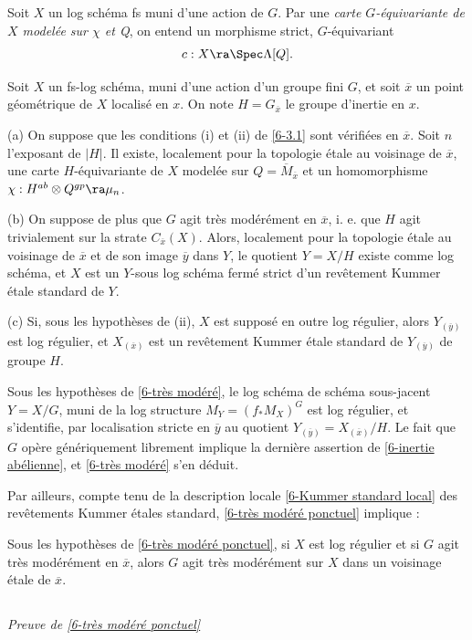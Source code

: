 \documentclass[10pt]{../fichiers-configuration-latex/smfart}
\begin{document}
Soit $X$ un log schéma fs muni d'une action de $G$. Par une \textit{carte $G$-équivariante de $X$
modelée sur $\chi$ et Q}, on entend un morphisme strict, $G$-équivariant $$ c : X \ra \Spec
\Lambda[Q].  $$ \begin{proposition}\label{6-très modéré ponctuel}\label{6-tres modere ponctuel} Soit
$X$ un fs-log schéma, muni d'une action d'un groupe fini $G$, et soit $\overline{x}$ un point
géométrique de $X$ localisé en $x$. On note $H = G_{\overline{x}}$ le groupe d'inertie en $x$. 

(a) On suppose que les conditions (i) et (ii) de \ref{6-3.1} sont vérifiées en $\overline{x}$. Soit
$n$ l'exposant de $|H|$. Il existe, localement pour la topologie étale au voisinage de
$\overline{x}$, une carte $H$-équivariante de $X$ modelée sur $Q =\overline{M}_{\overline{x}}$ et un
homomorphisme $\chi : H^{ab} \otimes Q^{gp} \ra \mu_n$. 

(b) On suppose de plus que $G$ agit très modérément en $\overline{x}$, i. e. que $H$ agit
trivialement sur la strate $C_{\overline{x}}(X)$. Alors, localement pour la topologie étale au
voisinage de $\overline{x}$ et de son image $\overline{y}$ dans $Y$, le quotient $Y = X/H$ existe
comme log schéma, et $X$ est un $Y$-sous log schéma fermé strict d'un revêtement Kummer étale
standard de $Y$.

(c) Si, sous les hypothèses de (ii), $X$ est supposé en outre log régulier, alors
$Y_{(\overline{y})}$ est log régulier, et $X_{(\overline{x})}$ est un revêtement Kummer étale
standard de $Y_{(\overline{y})}$ de groupe $H$.  \end{proposition} Sous les hypothèses de
\ref{6-très modéré}, le log schéma de schéma sous-jacent $Y = X/G$, muni de la log structure $M_Y =
(f_*M_{X})^{G}$ est log régulier, et s'identifie, par localisation stricte en $\overline{y}$ au
quotient $Y_{(\overline{y})} = X_{(\overline{x})}/H$. Le fait que $G$ opère génériquement librement
implique la dernière assertion de \ref{6-inertie abélienne}, et \ref{6-très modéré} s'en déduit.

Par ailleurs, compte tenu de la description locale \ref{6-Kummer standard local} des revêtements
Kummer étales standard, \ref{6-très modéré ponctuel} implique : \begin{corollaire} \label{6-tres
modere dans voisinage} Sous les hypothèses de \ref{6-très modéré ponctuel}, si $X$ est log régulier
et si $G$ agit très modérément en $\overline{x}$, alors $G$ agit très modérément sur $X$ dans un
voisinage étale de $\overline{x}$.  \end{corollaire} \subsection{} \label{6-preuve très modéré
ponctuel} \label{6-preuve tres modere ponctuel} \textit{Preuve de  \ref{6-très modéré ponctuel}} 
\end{document}
